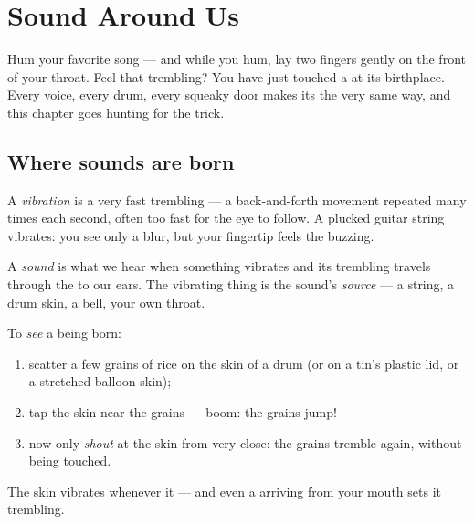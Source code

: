 \chapter{Sound Around Us}\label{ch:g3:sound-around-us}

Hum your favorite song --- and while you hum, lay two fingers gently
on the front of your throat. Feel that trembling? You have just
touched a  at its birthplace. Every voice, every drum, every
squeaky door makes its  the very same way, and this chapter
goes hunting for the trick.

\section{Where sounds are born}

\begin{definition}[Vibration]\label{def:g3:sound-around-us:vibration}
A \emph{vibration} is a very fast trembling --- a
back-and-forth movement repeated many times each second, often too
fast for the eye to follow. A plucked guitar string vibrates: you
see only a blur, but your fingertip feels the buzzing.
\end{definition}

\begin{definition}[Sound]\label{def:g3:sound-around-us:sound}
A \emph{sound} is what we hear when something
vibrates and its trembling travels through the  to our ears. The
vibrating thing is the sound's \emph{source} --- a string, a drum
skin, a bell, your own throat.
\end{definition}

\begin{method}\label{met:g3:sound-around-us:rice}
To \emph{see} a  being born:
\begin{enumerate}
  \item scatter a few grains of rice on the skin of a drum (or on a
        tin's plastic lid, or a stretched balloon skin);
  \item tap the skin near the grains --- boom: the grains jump!
  \item now only \emph{shout} at the skin from very close: the
        grains tremble again, without being touched.
\end{enumerate}
The skin vibrates whenever it  --- and even a  arriving
from your mouth sets it trembling.
\end{method}

